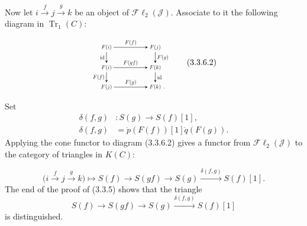 \clearpage
{}%
\begingroup
\small
\setlength{\abovedisplayskip}{3pt plus 2pt minus 2pt}%
\setlength{\belowdisplayskip}{3pt plus 2pt minus 2pt}%
\setlength{\jot}{2pt}%
Now let
$i\xrightarrow{f}j\xrightarrow{g}k$ be an object of
$\mathcal{F}\ell_2(\mathcal{J})$. Associate to it the following diagram in
$\operatorname{Tr}_1(C)$:

\begin{equation}
\begin{tikzpicture}[>=stealth,baseline=(current bounding box.center),scale=0.66,
  every node/.style={transform shape}]
  \node (Fi1) at (0,2.55) {$F(i)$};
  \node (Fj1) at (3.15,2.55) {$F(j)$};
  \node (Fi2) at (0,1.25) {$F(i)$};
  \node (Fk1) at (3.15,1.25) {$F(k)$};
  \node (Fj2) at (0,0) {$F(j)$};
  \node (Fk2) at (3.15,0) {$F(k)$};
  \draw[->] (Fi1) -- node[above] {$F(f)$} (Fj1);
  \draw[->] (Fi2) -- node[above] {$F(gf)$} (Fk1);
  \draw[->] (Fj2) -- node[above] {$F(g)$} (Fk2);
  \draw[->] (Fi1) -- node[left] {$\mathrm{id}$} (Fi2);
  \draw[->] (Fj1) -- node[right] {$F(g)$} (Fk1);
  \draw[->] (Fi2) -- node[left] {$F(f)$} (Fj2);
  \draw[->] (Fk1) -- node[right] {$\mathrm{id}$} (Fk2);
  \node[anchor=base west,inner sep=0pt,xshift=.08em] at (Fk2.base east) {$.$};
\end{tikzpicture}
\tag{3.3.6.2}
\end{equation}

Set
\begin{equation}
\begin{aligned}
  \delta(f,g)&\colon S(g)\longrightarrow S(f)[1],\\
  \delta(f,g)&=\dot p(F(f))[1]\dot q(F(g)).
\end{aligned}
\tag{3.3.6.3}
\end{equation}
Applying the cone functor to diagram (3.3.6.2) gives a functor from
$\mathcal{F}\ell_2(\mathcal{J})$ to the category of triangles in $K(C)$:

\begin{equation}
  \bigl(i\xrightarrow{f}j\xrightarrow{g}k\bigr)
  \longmapsto
  S(f)\longrightarrow S(gf)\longrightarrow S(g)
  \xrightarrow{\delta(f,g)}S(f)[1].
  \tag{3.3.6.4}
\end{equation}
The end of the proof of (3.3.5) shows that the triangle
\[
  S(f)\longrightarrow S(gf)\longrightarrow S(g)
  \xrightarrow{\delta(f,g)}S(f)[1]
\]
is distinguished.

